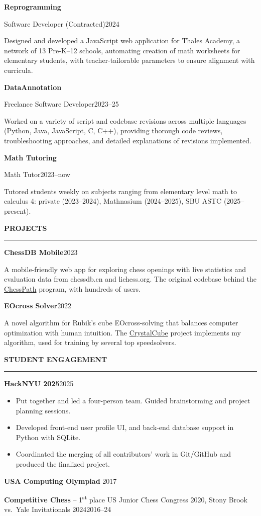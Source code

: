 \documentclass[10pt,letterpaper]{article}
\newcommand{\ressection}[1]{%
  \par\addvspace{7pt}%
  {\large\bfseries #1}\par\nobreak
  \vspace{2pt}\noindent\rule{\linewidth}{1pt}\par\nobreak
  \vspace{2pt}%
}
\newcommand{\entry}[2]{%
  \par\addvspace{2pt}%
  \noindent\textbf{#1}\hfill #2\par\nobreak
}
\newcommand{\subentry}[2]{%
  \noindent #1\hfill #2\par
}
\newcommand{\mixedentry}[3]{%
  \par\addvspace{2pt}%
  \noindent\textbf{#1} #2\hfill #3\par
}
\newcommand{\entrydesc}[1]{%
  \par\addvspace{1pt}%
  \noindent #1\par
}
\begin{document}
\entry{Reprogramming}{}
\subentry{Software Developer (Contracted)}{2024}
\entrydesc{Designed and developed a JavaScript web application for Thales Academy, a network of 13 Pre-K--12 schools, automating creation of math worksheets for elementary students, with teacher-tailorable parameters to ensure alignment with curricula.}

\entry{DataAnnotation}{}
\subentry{Freelance Software Developer}{2023--25}
\entrydesc{Worked on a variety of script and codebase revisions across multiple languages (Python, Java, JavaScript, C, C++), providing thorough code reviews, troubleshooting approaches, and detailed explanations of revisions implemented.}

\entry{Math Tutoring}{}
\subentry{Math Tutor}{2023--now}
\entrydesc{Tutored students weekly on subjects ranging from elementary level math to calculus 4: private (2023--2024), Mathnasium (2024--2025), SBU ASTC (2025--present).}

\ressection{PROJECTS}

\entry{ChessDB Mobile}{2023}
\entrydesc{A mobile-friendly web app for exploring chess openings with live statistics and evaluation data from chessdb.cn and lichess.org. The original codebase behind the \href{https://chesspath.pro}{ChessPath} program, with hundreds of users.}

\entry{EOcross Solver}{2022}
\entrydesc{A novel algorithm for Rubik's cube EOcross-solving that balances computer optimization with human intuition. The \href{https://crystalcuber.com}{CrystalCube} project implements my algorithm, used for training by several top speedsolvers.}

\ressection{STUDENT ENGAGEMENT}

\entry{HackNYU 2025}{2025}
\begin{itemize}
  \item Put together and led a four-person team. Guided brainstorming and project planning sessions.
  \item Developed front-end user profile UI, and back-end database support in Python with SQLite.
  \item Coordinated the merging of all contributors' work in Git/GitHub and produced the finalized project.
\end{itemize}

\mixedentry{USA Computing Olympiad}{}{2017}

\mixedentry{Competitive Chess}{-- 1\textsuperscript{st} place US Junior Chess Congress 2020, Stony Brook vs.\ Yale Invitationals 2024}{2016--24}
\end{document}
